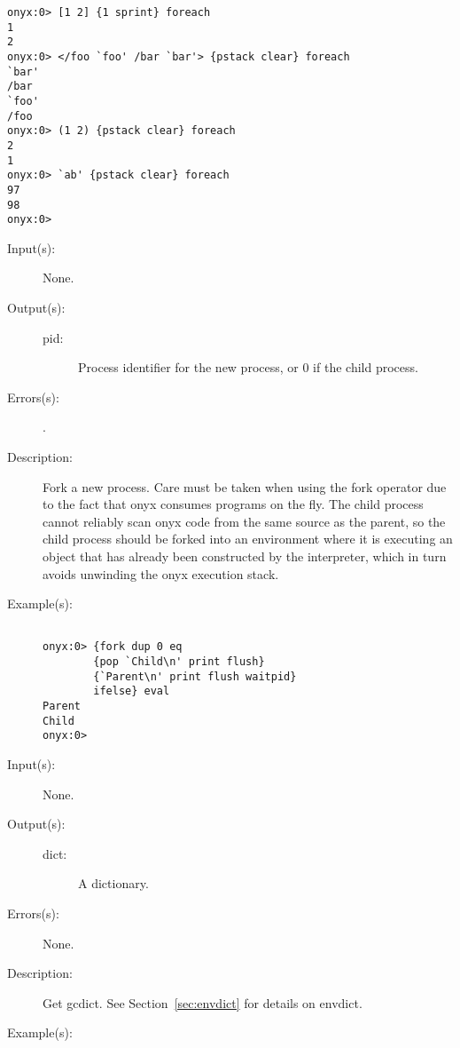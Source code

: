 \begin{description}
\begin{description}
\begin{verbatim}
onyx:0> [1 2] {1 sprint} foreach
1
2
onyx:0> </foo `foo' /bar `bar'> {pstack clear} foreach
`bar'
/bar
`foo'
/foo
onyx:0> (1 2) {pstack clear} foreach
2
1
onyx:0> `ab' {pstack clear} foreach
97
98
onyx:0>
		\end{verbatim}
	\end{description}
\label{systemdict:fork}
\item[{\onyxop{--}{fork}{pid}}: ]
	\begin{description}\item[]
	\item[Input(s): ] None.
	\item[Output(s): ]
		\begin{description}\item[]
		\item[pid: ]
			Process identifier for the new process, or 0 if the
			child process.
		\end{description}
	\item[Errors(s): ]
		\begin{description}\item[]
		\item[.]
		\end{description}
	\item[Description: ]
		Fork a new process.  Care must be taken when using the fork
		operator due to the fact that onyx consumes programs on the
		fly.  The child process cannot reliably scan onyx code from the
		same source as the parent, so the child process should be forked
		into an environment where it is executing an object that has
		already been constructed by the interpreter, which in turn
		avoids unwinding the onyx execution stack.
	\item[Example(s): ]\begin{verbatim}

onyx:0> {fork dup 0 eq
        {pop `Child\n' print flush}
        {`Parent\n' print flush waitpid}
        ifelse} eval
Parent
Child
onyx:0>
		\end{verbatim}
	\end{description}
\label{systemdict:gcdict}
\item[{\onyxop{--}{gcdict}{dict}}: ]
	\begin{description}\item[]
	\item[Input(s): ] None.
	\item[Output(s): ]
		\begin{description}\item[]
		\item[dict: ]
			A dictionary.
		\end{description}
	\item[Errors(s): ] None.
	\item[Description: ]
		Get gcdict.  See Section~\ref{sec:envdict} for details on
		envdict.
	\item[Example(s): ]\begin{verbatim}


\end{verbatim}
\end{description}
\end{description}
